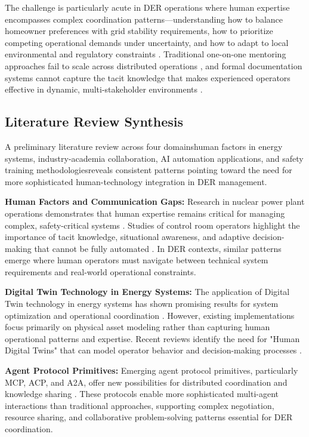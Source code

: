 \documentclass[12pt,a4paper]{article}
\newcommand{\emdash}{\textemdash}
\begin{document}
The challenge is particularly acute in DER operations where human expertise encompasses complex coordination patterns—understanding how to balance homeowner preferences with grid stability requirements, how to prioritize competing operational demands under uncertainty, and how to adapt to local environmental and regulatory constraints \cite{10.1109/ACCESS.2024.3387400}. Traditional one-on-one mentoring approaches fail to scale across distributed operations \cite{10.1007/s44163-022-00020-w}, and formal documentation systems cannot capture the tacit knowledge that makes experienced operators effective in dynamic, multi-stakeholder environments \cite{10.1016/j.apergo.2018.07.016}.

\subsection{Literature Review Synthesis}

A preliminary literature review across four domains\emdash{}human factors in energy systems, industry-academia collaboration, AI automation applications, and safety training methodologies\emdash{}reveals consistent patterns pointing toward the need for more sophisticated human-technology integration in DER management.

\textbf{Human Factors and Communication Gaps:} Research in nuclear power plant operations demonstrates that human expertise remains critical for managing complex, safety-critical systems \cite{10.1108/13552510610654510}. Studies of control room operators highlight the importance of tacit knowledge, situational awareness, and adaptive decision-making that cannot be fully automated \cite{10.1049/OAP-CIRED.2017.1107}. In DER contexts, similar patterns emerge where human operators must navigate between technical system requirements and real-world operational constraints.

\textbf{Digital Twin Technology in Energy Systems:} The application of Digital Twin technology in energy systems has shown promising results for system optimization and operational coordination \cite{10.1016/j.esr.2024.101334}. However, existing implementations focus primarily on physical asset modeling rather than capturing human operational patterns and expertise. Recent reviews identify the need for "Human Digital Twins" that can model operator behavior and decision-making processes \cite{10.1109/ETFA61755.2024.10711109}.

\textbf{Agent Protocol Primitives:} Emerging agent protocol primitives, particularly MCP, ACP, and A2A, offer new possibilities for distributed coordination and knowledge sharing \cite{10.5220/0001894702000205}. These protocols enable more sophisticated multi-agent interactions than traditional approaches, supporting complex negotiation, resource sharing, and collaborative problem-solving patterns essential for DER coordination.
\end{document}
